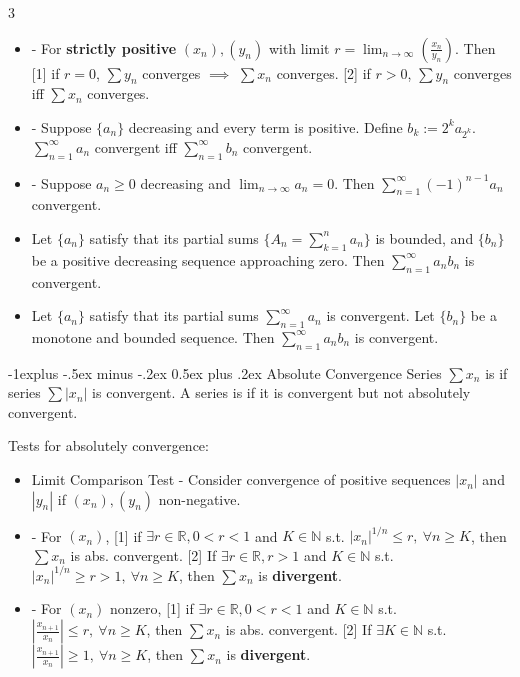 \documentclass[10pt,landscape,letterpaper]{article}
\makeatletter
\renewcommand{\subsection}{\@startsection{subsection}{2}{0mm}%
                                {-1explus -.5ex minus -.2ex}%
                                {0.5ex plus .2ex}%
                                {\sffamily\normalsize\itshape}}
\makeatother
\begin{document}
\begin{multicols}{3}
\begin{itemize}
    \item {} - For \textbf{strictly positive} $(x_n), (y_n)$ with limit $r = \lim_{n \to \infty} (\frac{x_n}{y_n})$. Then [1] if $r = 0$, $\sum y_n$ converges $\implies$ $\sum x_n$ converges. [2] if $r > 0$, $\sum y_n$ converges iff $\sum x_n$ converges.

    \item {} - Suppose $\{a_n\}$ decreasing and every term is positive. Define $b_k:=2^ka_{2^k}$. $\sum_{n=1}^\infty a_n$ convergent iff $\sum_{n=1}^\infty b_n$ convergent.

    \item {} - Suppose $a_n \geq 0$ decreasing and $\lim_{n\rightarrow\infty} a_n = 0$. Then $\sum_{n=1}^{\infty}(-1)^{n - 1}a_n$ convergent. 

    \item {} Let $\{a_n\}$ satisfy that its partial sums $\{A_n=\sum_{k=1}^n a_n\}$ is bounded, and $\{b_n\}$ be a positive decreasing sequence approaching zero. Then $\sum_{n=1}^\infty a_nb_n$ is convergent.

    \item {} Let $\{a_n\}$ satisfy that its partial sums $\sum_{n=1}^\infty a_n$ is convergent. Let $\{b_n\}$ be a monotone and bounded sequence. Then $\sum_{n=1}^\infty a_nb_n$ is convergent.
\end{itemize}





\subsection{Absolute Convergence}
Series $\sum x_n$ is  if series $\sum |x_n|$ is convergent. A series is  if it is convergent but not absolutely convergent.

Tests for absolutely convergence:
\begin{itemize}
    \item Limit Comparison Test - Consider convergence of positive sequences $|x_n|$ and $|y_n|$ if $(x_n), (y_n)$ non-negative.
    \item {} - For $(x_n)$, [1] if $\exists r \in \mathbb{R}, 0 < r < 1$ and $K \in \mathbb{N}$ s.t. $|x_n|^{1/n} \le r, \ \forall n \ge K$, then $\sum x_n$ is abs. convergent. [2] If $\exists r \in \mathbb{R}, r > 1$ and $K \in \mathbb{N}$ s.t. $|x_n|^{1/n} \ge r > 1, \ \forall n \ge K$, then $\sum x_n$ is \textbf{divergent}.
    \item {} - For $(x_n)$ nonzero, [1] if $\exists r \in \mathbb{R}, 0 < r < 1$ and $K \in \mathbb{N}$ s.t. $|\frac{x_{n+1}}{x_n}| \le r, \ \forall n \ge K$, then $\sum x_n$ is abs. convergent. [2] If $\exists K \in \mathbb{N}$ s.t. $|\frac{x_{n+1}}{x_n}| \ge 1, \ \forall n \ge K$, then $\sum x_n$ is \textbf{divergent}.


\end{itemize}
\end{multicols}
\end{document}
